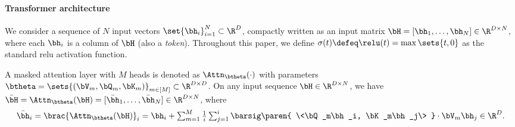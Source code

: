 \documentclass[10pt]{article}
\newcommand{\authnote}[2]{{\scriptsize $\ll$\textsf{#1 notes: #2}$\gg$}}
\newcommand{\authnote}[2]{}
\newcommand{\lc}[1]{{\color{blue}\authnote{Licong}{#1}}}
\begin{document}

\paragraph{Transformer architecture} We consider a sequence of $N$ input vectors $\set{\bh_i}_{i=1}^N\subset \R^D$, compactly written as an input matrix $\bH=[\bh_1,\dots,\bh_N]\in \R^{D\times N}$, where each $\bh_i$ is a column of $\bH$ (also a \emph{token}). Throughout this paper, we define $\sigma(t)\defeq \relu(t)=\max\sets{t,0}$ as the standard relu activation function. %



\begin{definition}
\label{def:masked-attention}
A masked attention layer with $M$ heads is denoted as $\Attn_{\btheta}(\cdot)$ with parameters $\btheta=\sets{ (\bV_m,\bQ_m,\bK_m)}_{m\in[M]}\subset \R^{D\times D}$. On any input sequence $\bH\in\R^{D\times N}$, we have $\bar{\bH} = \Attn_{\btheta}(\bH) = [\bar{\bh}_1, \ldots, \bar{\bh}_N] \in \R^{D \times N}$, where
\begin{align*}
\textstyle    \bar{\bh}_i = \brac{\Attn_{\btheta}(\bH)}_i = \bh_i + \sum_{m=1}^M \frac{1}{i}\sum_{j=1}^i \barsig\paren{ \<\bQ_m\bh_i, \bK_m\bh_j\> }\cdot \bV_m\bh_j \in \R^D.
\end{align*}
\end{definition}
\end{document}
